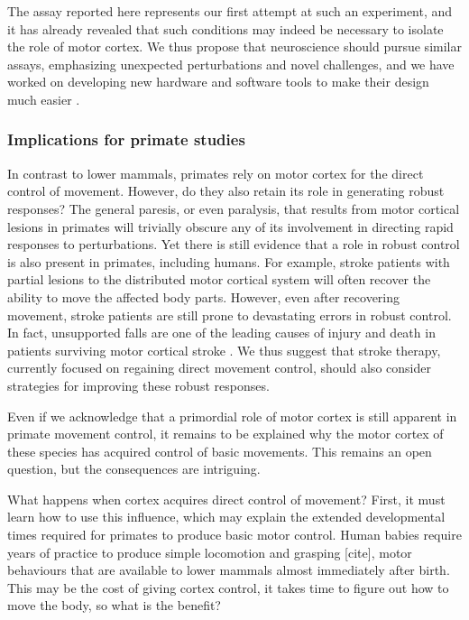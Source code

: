The assay reported here represents our first attempt at such an experiment, and it has already revealed that such conditions may indeed be necessary to isolate the role of motor cortex. We thus propose that neuroscience should pursue similar assays, emphasizing unexpected perturbations and novel challenges, and we have worked on developing new hardware and software tools to make their design much easier \cite{Lopes2015a}.

\subsubsection*{Implications for primate studies}

In contrast to lower mammals, primates rely on motor cortex for the direct control of movement. However, do they also retain its role in generating robust responses? The general paresis, or even paralysis, that results from motor cortical lesions in primates will trivially obscure any of its involvement in directing rapid responses to perturbations. Yet there is still evidence that a role in robust control is also present in primates, including humans. For example, stroke patients with partial lesions to the distributed motor cortical system will often recover the ability to move the affected body parts. However, even after recovering movement, stroke patients are still prone to devastating errors in robust control. In fact, unsupported falls are one of the leading causes of injury and death in patients surviving motor cortical stroke \cite{Jacobs2014}. We thus suggest that stroke therapy, currently focused on regaining direct movement control, should also consider strategies for improving these robust responses.

Even if we acknowledge that a primordial role of motor cortex is still apparent in primate movement control, it remains to be explained why the motor cortex of these species has acquired control of basic movements. This remains an open question, but the consequences are intriguing.


What happens when cortex acquires direct control of movement? First, it must learn how to use this influence, which may explain the extended developmental times required for primates to produce basic motor control. Human babies require years of practice to produce simple locomotion and grasping [cite], motor behaviours that are available to lower mammals almost immediately after birth. This may be the cost of giving cortex control, it takes time to figure out how to move the body, so what is the benefit? 


